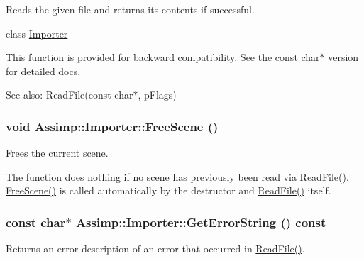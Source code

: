 Reads the given file and returns its contents if successful. 

class \hyperlink{class_assimp_1_1_importer}{Importer}

This function is provided for backward compatibility. See the const char$\ast$ version for detailed docs. \begin{Desc}
\item[See also:]ReadFile(const char$\ast$, pFlags) \end{Desc}
\hypertarget{class_assimp_1_1_importer_53dafc3046abc33365a07c605716c5d4}{
\subsubsection[FreeScene]{\setlength{\rightskip}{0pt plus 5cm}void Assimp::Importer::FreeScene ()}}
\label{class_assimp_1_1_importer_53dafc3046abc33365a07c605716c5d4}


Frees the current scene.

The function does nothing if no scene has previously been read via \hyperlink{class_assimp_1_1_importer_174418ab41d5b8bc51a044895cb991e5}{ReadFile()}. \hyperlink{class_assimp_1_1_importer_53dafc3046abc33365a07c605716c5d4}{FreeScene()} is called automatically by the destructor and \hyperlink{class_assimp_1_1_importer_174418ab41d5b8bc51a044895cb991e5}{ReadFile()} itself. \hypertarget{class_assimp_1_1_importer_23bab5ba8cb9b6886c690a610766668b}{
\subsubsection[GetErrorString]{\setlength{\rightskip}{0pt plus 5cm}const char$\ast$ Assimp::Importer::GetErrorString () const}}
\label{class_assimp_1_1_importer_23bab5ba8cb9b6886c690a610766668b}


Returns an error description of an error that occurred in \hyperlink{class_assimp_1_1_importer_174418ab41d5b8bc51a044895cb991e5}{ReadFile()}.

